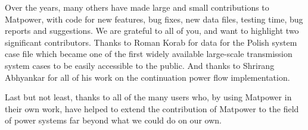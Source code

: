 \documentclass[12pt]{article}
\newcommand{\matpower}[0]{{\sc Matpower}}
\numberwithin{equation}{section}
\numberwithin{table}{section}
\numberwithin{figure}{section}
\begin{document}
Over the years, many others have made large and small contributions to \matpower{}, with code for new features, bug fixes, new data files, testing time, bug reports and suggestions. We are grateful to all of you, and want to highlight two significant contributors. Thanks to Roman Korab for data for the Polish system case file which became one of the first widely available large-scale transmission system cases to be easily accessible to the public. And thanks to Shrirang Abhyankar for all of his work on the continuation power flow implementation.

Last but not least, thanks to all of the many users who, by using \matpower{} in their own work, have helped to extend the contribution of \matpower{} to the field of power systems far beyond what we could do on our own.

\end{document}
